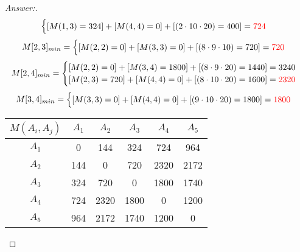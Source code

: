 \documentclass[11pt]{article}
\theoremstyle{definition}
\theoremstyle{definition}
\theoremstyle{definition}
\begin{document}
\begin{proof}[Answer:]
\[\begin{cases}
[M(1, 3) = 324] + [M(4, 4) = 0] + [(2 \cdot 10 \cdot 20) = 400] = \color{red} 724  \\
\end{cases}
\]
\[
M[2, 3]_{min} = \begin{cases} 
[M(2, 2) = 0] + [M(3, 3) = 0] + [(8 \cdot 9 \cdot 10) = 720] = \color{red} 720  \\
\end{cases}
\]
\[
M[2, 4]_{min} = \begin{cases} 
[M(2, 2) = 0] + [M(3, 4) = 1800] + [(8 \cdot 9 \cdot 20) = 1440] = 3240  \\
[M(2, 3) = 720] + [M(4, 4) = 0] + [(8 \cdot 10 \cdot 20) = 1600] = \color{red} 2320  \\
\end{cases}
\]
\[
M[3, 4]_{min} = \begin{cases} 
[M(3, 3) = 0] + [M(4, 4) = 0] + [(9 \cdot 10 \cdot 20) = 1800] = \color{red} 1800  \\
\end{cases}
\]
\item
\item
\item
\begin{tabular}{|c|c|c|c|c|c|} 
\hline
\textbf{$M(A_i, A_j)$} & \textbf{$A_1$} & \textbf{$A_2$} & \textbf{$A_3$} & \textbf{$A_4$} & \textbf{$A_5$} \\
\hline
\textbf{$A_1$} & 0 & 144 & 324 & 724 & 964 \\
\hline
\textbf{$A_2$} & 144 & 0 & 720 & 2320 & 2172 \\
\hline
\textbf{$A_3$} & 324 & 720 & 0 & 1800 & 1740 \\
\hline
\textbf{$A_4$} & 724 & 2320 & 1800 & 0 & 1200 \\
\hline
\textbf{$A_5$} & 964 & 2172 & 1740 & 1200 & 0 \\
\hline
\end{tabular}
\end{proof}
\end{document}
